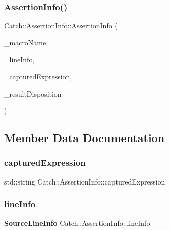 \mbox{\label{struct_catch_1_1_assertion_info_aaf6cc3eebd40391e54d37ed42953c73f}} 
\subsubsection{Assertion\+Info()\hspace{0.1cm}{\footnotesize\ttfamily [2/2]}}
{\footnotesize\ttfamily Catch\+::\+Assertion\+Info\+::\+Assertion\+Info (\begin{DoxyParamCaption}\item[{std\+::string const \&}]{\+\_\+macro\+Name,  }\item[{\textbf{ Source\+Line\+Info} const \&}]{\+\_\+line\+Info,  }\item[{std\+::string const \&}]{\+\_\+captured\+Expression,  }\item[{\textbf{ Result\+Disposition\+::\+Flags}}]{\+\_\+result\+Disposition }\end{DoxyParamCaption})}



\subsection{Member Data Documentation}
\mbox{\label{struct_catch_1_1_assertion_info_af7c1d3cbfa346e9a303030fa0ef0cb54}} 
\subsubsection{captured\+Expression}
{\footnotesize\ttfamily std\+::string Catch\+::\+Assertion\+Info\+::captured\+Expression}

\mbox{\label{struct_catch_1_1_assertion_info_a17bdbb404ba12658034f833be2f4c3e7}} 
\subsubsection{line\+Info}
{\footnotesize\ttfamily \textbf{ Source\+Line\+Info} Catch\+::\+Assertion\+Info\+::line\+Info}

